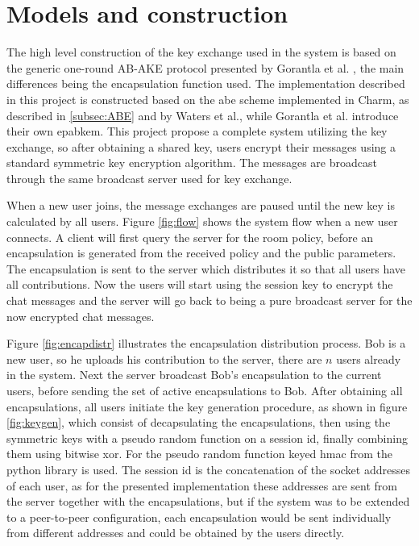 \section{Models and construction}
The high level construction of the key exchange used in the system is based on the generic one-round AB-AKE protocol presented by Gorantla et al. \cite{gorantla2010attribute}, the main differences being the encapsulation function used. The implementation described in this project is constructed based on the \gls{abe} scheme implemented in Charm, as described in \ref{subsec:ABE} and  by Waters et al.\cite{abe_waters09}, while Gorantla et al.\cite{gorantla2010attribute} introduce their own \gls{epabkem}. This project propose a complete system utilizing the key exchange, so after obtaining a shared key, users encrypt their messages using a standard symmetric key encryption algorithm. The messages are broadcast through the same broadcast server used for key exchange. 
\par When a new user joins, the message exchanges are paused until the new key is calculated by all users. Figure \ref{fig:flow} shows the system flow when a new user connects. A client will first query the server for the room policy, before an encapsulation is generated from the received policy and the public parameters. The encapsulation is sent to the server which distributes it so that all users have all contributions. Now the users will start using the session key to encrypt the chat messages and the server will go back to being a pure broadcast server for the now encrypted chat messages. 
\par Figure \ref{fig:encapdistr} illustrates the encapsulation distribution process. Bob is a new user, so he uploads his contribution to the server, there are $n$ users already in the system. Next the server broadcast Bob's encapsulation to the current users, before sending the set of active encapsulations to Bob. After obtaining all encapsulations, all users initiate the key generation procedure, as shown in figure \ref{fig:keygen}, which consist of decapsulating the encapsulations, then using the symmetric keys with a pseudo random function on a session id, finally combining them using bitwise xor. For the pseudo random function keyed hmac from the python library is used. The session id is the concatenation of the socket addresses of each user, as for the presented implementation these addresses are sent from the server together with the encapsulations, but if the system was to be extended to a peer-to-peer configuration, each encapsulation would be sent individually from different addresses and could be obtained by the users directly. 

